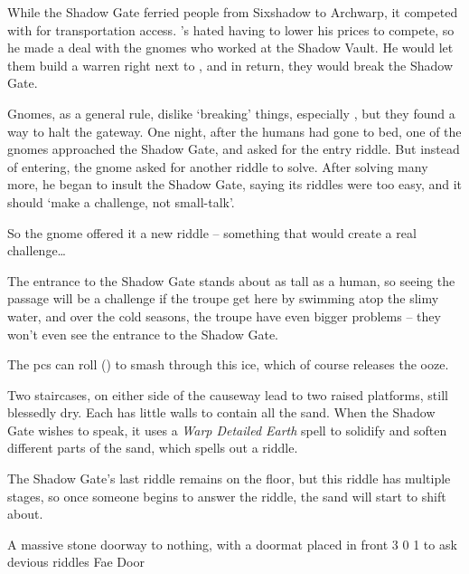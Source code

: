 \begin{multicols}{2}
\begin{exampletext}
  While the Shadow Gate ferried people from Sixshadow to Archwarp, it competed with  for transportation access.
  's  hated having to lower his prices to compete, so he made a deal with the gnomes who worked at the Shadow Vault.
  He would let them build a warren right next to , and in return, they would break the Shadow Gate.

  Gnomes, as a general rule, dislike `breaking' things, especially , but they found a way to halt the gateway.
  One night, after the humans had gone to bed, one of the gnomes approached the Shadow Gate, and asked for the entry riddle.
  But instead of entering, the gnome asked for another riddle to solve.
  After solving many more, he began to insult the Shadow Gate, saying its riddles were too easy, and it should `make a challenge, not small-talk'.

  So the gnome offered it a new riddle -- something that would create a real challenge\ldots
\end{exampletext}

The entrance to the Shadow Gate stands about as tall as a human, so seeing the passage will be a challenge if the troupe get here by swimming atop the slimy water, and over the cold seasons, the troupe have even bigger problems -- they won't even see the entrance to the Shadow Gate.

The \glspl{pc} can roll  (\tn[10]) to smash through this ice, which of course releases the ooze.

Two staircases, on either side of the causeway lead to two raised platforms, still blessedly dry.
Each has little walls to contain all the sand.
When the Shadow Gate wishes to speak, it uses a \textit{Warp Detailed Earth} spell to solidify and soften different parts of the sand, which spells out a riddle.

The Shadow Gate's last riddle remains on the floor, but this riddle has multiple stages, so once someone begins to answer the riddle, the sand will start to shift about.

  {A massive stone doorway to nothing, with a doormat placed in front}%
  {3}%
  {0}%
  {1}%
  {to ask devious riddles}%
  {Fae Door}%
  {
    \setcounter{Fire}{2}
    \setcounter{Earth}{3}
    \setcounter{Water}{1}
    \setcounter{Academics}{2}
    \setcounter{Caving}{1}
    \setcounter{Xenomology}{1}
  }%


\end{multicols}
